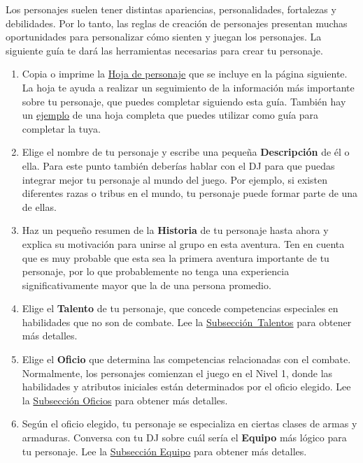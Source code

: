 Los personajes suelen tener distintas apariencias, personalidades, fortalezas y debilidades. Por lo tanto, las reglas de creación de personajes presentan muchas oportunidades para personalizar cómo sienten y juegan los personajes. La siguiente guía te dará las herramientas necesarias para crear tu personaje.
\pagebreak%

\begin{enumerate}[leftmargin=*]
	
\item Copia o imprime la \hyperlink{cs}{Hoja de personaje} que se incluye en la página siguiente. La hoja te ayuda a realizar un seguimiento de la información más importante sobre tu personaje, que puedes completar siguiendo esta guía. También hay un \hyperlink{csex}{ejemplo} de una hoja completa que puedes utilizar como guía para completar la tuya.

\vfill 

\item Elige el nombre de tu personaje y escribe una pequeña \textbf{Descripción} de él o ella. Para este punto también deberías hablar con el DJ para que puedas integrar mejor tu personaje al mundo del juego. Por ejemplo, si existen diferentes razas o tribus en el mundo, tu personaje puede formar parte de una de ellas.

\vfill	

\item Haz un pequeño resumen de la \textbf{Historia} de tu personaje hasta ahora y explica su motivación para unirse al grupo en esta aventura. Ten en cuenta que es muy probable que esta sea la primera aventura importante de tu personaje, por lo que probablemente no tenga una experiencia significativamente mayor que la de una persona promedio.

\vfill

\item Elige el \textbf{Talento} de tu personaje, que concede competencias especiales en habilidades que no son de combate. Lee la \mbox{\hyperlink{talent}{Subsección Talentos}} para obtener más detalles.

\vfill

\item Elige el \textbf{Oficio} que determina las competencias relacionadas con el combate. Normalmente, los personajes comienzan el juego en el Nivel 1, donde las habilidades y atributos iniciales están determinados por el oficio elegido. Lee la \hyperlink{job}{Subsección Oficios} para obtener más detalles.

\vfill

\item Según el oficio elegido, tu personaje se especializa en ciertas clases de armas y armaduras. Conversa con tu DJ sobre cuál sería el \textbf{Equipo} más lógico para tu personaje. Lee la \hyperlink{equip}{Subsección Equipo} para obtener más detalles.

\end{enumerate}

